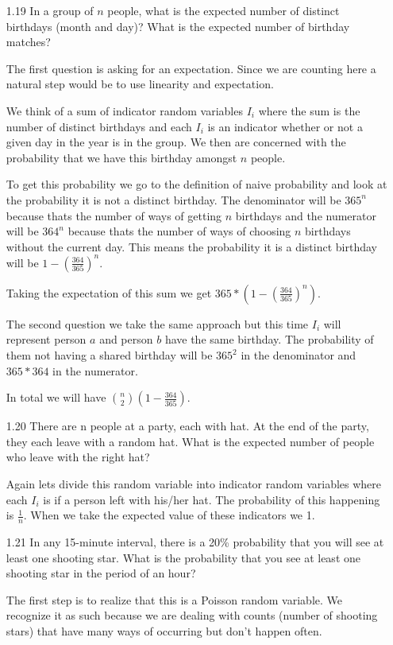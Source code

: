 \begin{enumerate}
\item[1.19]
In a group of $n$ people, what is the expected number of distinct birthdays (month and day)? What is the expected number of birthday matches?

The first question is asking for an expectation. Since we are counting here a natural step would be to use linearity and expectation.

We think of a sum of indicator random variables $I_i$ where the sum is the number of distinct birthdays and each $I_i$ is an indicator whether or not a given day in the year is in the group. We then are concerned with the probability that we have this birthday amongst $n$ people.

To get this probability we go to the definition of naive probability and look at the probability it is not a distinct birthday. The denominator will be $365^{n}$ because thats the number of ways of getting $n$ birthdays and the numerator will be $364^n$ because thats the number of ways of choosing $n$ birthdays without the current day. This means the probability it is a distinct birthday will be $1 - (\frac{364}{365})^n$. 

Taking the expectation of this sum we get $365*(1 - (\frac{364}{365})^n)$.

The second question we take the same approach but this time $I_i$ will represent person $a$ and person $b$ have the same birthday. The probability of them not having a shared birthday will be $365^2$ in the denominator and $365*364$ in the numerator.

In total we will have ${n \choose 2 } (1 - \frac{364}{365})$.


\item[1.20]
There are n people at a party, each with hat. At the end of the party, they each leave with a random hat. What is the expected number of people who leave with the right hat?

Again lets divide this random variable into indicator random variables where each $I_i$ is if a person left with his/her hat. The probability of this happening is $\frac{1}{n}$. When we take the expected value of these indicators we 1. 

\item[1.21]
In any 15-minute interval, there is a 20\% probability that you will see at least one shooting star. What is the probability that you see at least one shooting star in the period of an hour?


The first step is to realize that this is a Poisson random variable. We recognize it as such because we are dealing with counts (number of shooting stars) that have many ways of occurring but don't happen often. 


\end{enumerate}
